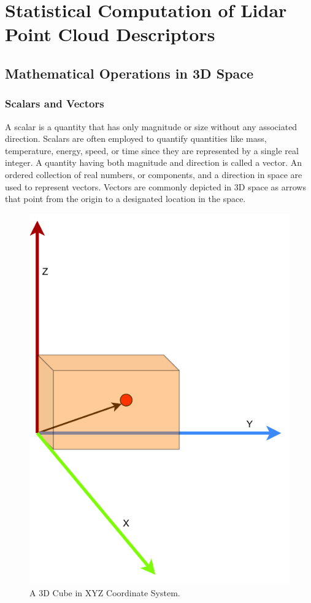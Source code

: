 \section{Statistical Computation of Lidar Point Cloud Descriptors}
\subsection{Mathematical Operations in 3D Space}
\subsubsection{Scalars and Vectors}
A scalar is a quantity that has only magnitude or size without any associated direction. Scalars are often employed to quantify quantities like mass, temperature, energy, speed, or time since they are represented by a single real integer. A quantity having both magnitude and direction is called a vector. An ordered collection of real numbers, or components, and a direction in space are used to represent vectors. Vectors are commonly depicted in 3D space as arrows that point from the origin to a designated location in the space.


\begin{figure}[htbp]
    \centering
    \includegraphics[width=0.4\linewidth]{97_graphics/related_work/scalar_and_vector.pdf}
    \caption{A 3D Cube in XYZ Coordinate System.}
    \label{fig:related_work-scalar_and_vector}
\end{figure}

